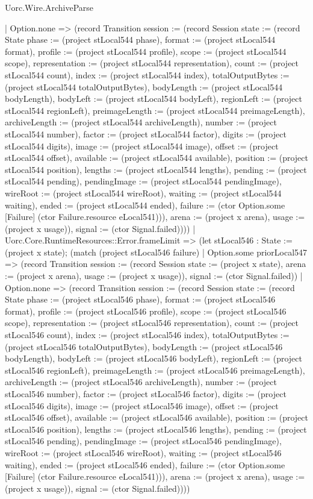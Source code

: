\begin{lexlean}{Uorc.Wire.ArchiveParse}
\begin{semanticmodule}
{        | Option.none => (record Transition {session := (record Session {state := (record State {phase := (project stLocal544 phase), format := (project stLocal544 format), profile := (project stLocal544 profile), scope := (project stLocal544 scope), representation := (project stLocal544 representation), count := (project stLocal544 count), index := (project stLocal544 index), totalOutputBytes := (project stLocal544 totalOutputBytes), bodyLength := (project stLocal544 bodyLength), bodyLeft := (project stLocal544 bodyLeft), regionLeft := (project stLocal544 regionLeft), preimageLength := (project stLocal544 preimageLength), archiveLength := (project stLocal544 archiveLength), number := (project stLocal544 number), factor := (project stLocal544 factor), digits := (project stLocal544 digits), image := (project stLocal544 image), offset := (project stLocal544 offset), available := (project stLocal544 available), position := (project stLocal544 position), lengths := (project stLocal544 lengths), pending := (project stLocal544 pending), pendingImage := (project stLocal544 pendingImage), wireRoot := (project stLocal544 wireRoot), waiting := (project stLocal544 waiting), ended := (project stLocal544 ended), failure := (ctor Option.some [Failure] (ctor Failure.resource eLocal541))}), arena := (project x arena), usage := (project x usage)}), signal := (ctor Signal.failed)})))
      | Uorc.Core.RuntimeResources::Error.frameLimit => (let stLocal546 : State := (project x state); (match (project stLocal546 failure)
        | Option.some priorLocal547 => (record Transition {session := (record Session {state := (project x state), arena := (project x arena), usage := (project x usage)}), signal := (ctor Signal.failed)})
        | Option.none => (record Transition {session := (record Session {state := (record State {phase := (project stLocal546 phase), format := (project stLocal546 format), profile := (project stLocal546 profile), scope := (project stLocal546 scope), representation := (project stLocal546 representation), count := (project stLocal546 count), index := (project stLocal546 index), totalOutputBytes := (project stLocal546 totalOutputBytes), bodyLength := (project stLocal546 bodyLength), bodyLeft := (project stLocal546 bodyLeft), regionLeft := (project stLocal546 regionLeft), preimageLength := (project stLocal546 preimageLength), archiveLength := (project stLocal546 archiveLength), number := (project stLocal546 number), factor := (project stLocal546 factor), digits := (project stLocal546 digits), image := (project stLocal546 image), offset := (project stLocal546 offset), available := (project stLocal546 available), position := (project stLocal546 position), lengths := (project stLocal546 lengths), pending := (project stLocal546 pending), pendingImage := (project stLocal546 pendingImage), wireRoot := (project stLocal546 wireRoot), waiting := (project stLocal546 waiting), ended := (project stLocal546 ended), failure := (ctor Option.some [Failure] (ctor Failure.resource eLocal541))}), arena := (project x arena), usage := (project x usage)}), signal := (ctor Signal.failed)})))
}
\end{semanticmodule}
\end{lexlean}
